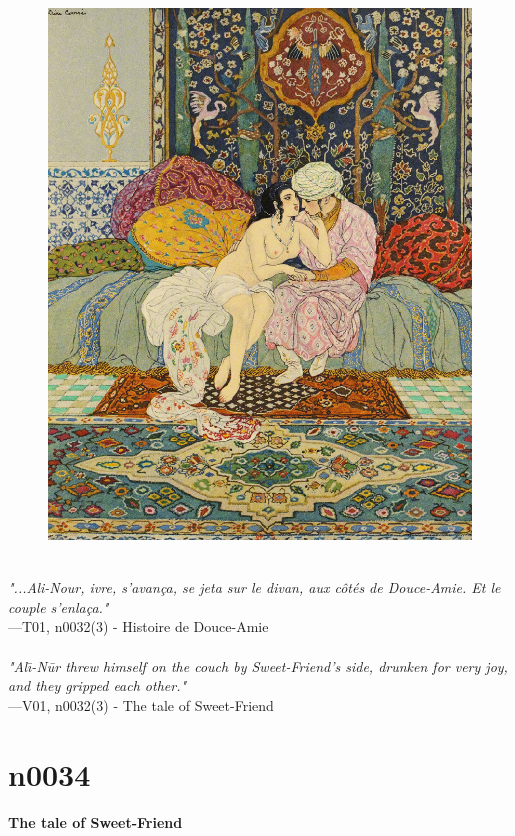 \documentclass[../Carre_nights.tex]{subfiles}
\begin{document}
\begin{figure}[ht]
\centering
\includegraphics[height=\figsize]{illustrations/volume_1/T01, n0032(3) - Histoire de Douce-Amie.jpg}
\end{figure}

\textit{\\
"...Ali-Nour, ivre, s’avança, se jeta sur le divan, aux côtés de Douce-Amie. Et le couple s’enlaça."} \\
—T01, n0032(3) - Histoire de Douce-Amie \\~\\
\textit{"Al\={\i}-N\=ur threw himself on the couch by Sweet-Friend's side, drunken for very joy, and they gripped each other."} \\
—V01, n0032(3) - The tale of Sweet-Friend

\newpage

\section{n0034}
\textbf{\Large{The tale of Sweet-Friend}} \\
\end{document}
